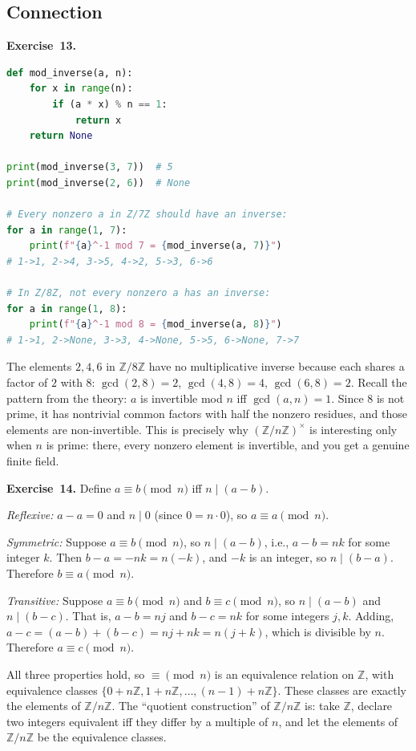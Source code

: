 \documentclass[11pt]{article}
\begin{document}
\subsection*{Connection}

\textbf{Exercise~13.}
\begin{lstlisting}[language=Python]
def mod_inverse(a, n):
    for x in range(n):
        if (a * x) % n == 1:
            return x
    return None

print(mod_inverse(3, 7))  # 5
print(mod_inverse(2, 6))  # None

# Every nonzero a in Z/7Z should have an inverse:
for a in range(1, 7):
    print(f"{a}^-1 mod 7 = {mod_inverse(a, 7)}")
# 1->1, 2->4, 3->5, 4->2, 5->3, 6->6

# In Z/8Z, not every nonzero a has an inverse:
for a in range(1, 8):
    print(f"{a}^-1 mod 8 = {mod_inverse(a, 8)}")
# 1->1, 2->None, 3->3, 4->None, 5->5, 6->None, 7->7
\end{lstlisting}

The elements $2, 4, 6$ in $\mathbb{Z}/8\mathbb{Z}$ have no multiplicative inverse because each shares a factor of $2$ with $8$: $\gcd(2, 8) = 2$, $\gcd(4, 8) = 4$, $\gcd(6, 8) = 2$. Recall the pattern from the theory: $a$ is invertible mod $n$ iff $\gcd(a, n) = 1$. Since $8$ is not prime, it has nontrivial common factors with half the nonzero residues, and those elements are non-invertible. This is precisely why $(\mathbb{Z}/n\mathbb{Z})^{\times}$ is interesting only when $n$ is prime: there, every nonzero element is invertible, and you get a genuine finite field.

\medskip
\textbf{Exercise~14.}
Define $a \equiv b \pmod n$ iff $n \mid (a - b)$.

\emph{Reflexive:} $a - a = 0$ and $n \mid 0$ (since $0 = n \cdot 0$), so $a \equiv a \pmod n$. \checkmark

\emph{Symmetric:} Suppose $a \equiv b \pmod n$, so $n \mid (a - b)$, i.e., $a - b = nk$ for some integer $k$. Then $b - a = -nk = n(-k)$, and $-k$ is an integer, so $n \mid (b - a)$. Therefore $b \equiv a \pmod n$. \checkmark

\emph{Transitive:} Suppose $a \equiv b \pmod n$ and $b \equiv c \pmod n$, so $n \mid (a - b)$ and $n \mid (b - c)$. That is, $a - b = nj$ and $b - c = nk$ for some integers $j, k$. Adding, $a - c = (a - b) + (b - c) = nj + nk = n(j + k)$, which is divisible by $n$. Therefore $a \equiv c \pmod n$. \checkmark

All three properties hold, so $\equiv \pmod n$ is an equivalence relation on $\mathbb{Z}$, with equivalence classes $\{0 + n\mathbb{Z}, 1 + n\mathbb{Z}, \ldots, (n-1) + n\mathbb{Z}\}$. These classes are exactly the elements of $\mathbb{Z}/n\mathbb{Z}$. The ``quotient construction'' of $\mathbb{Z}/n\mathbb{Z}$ is: take $\mathbb{Z}$, declare two integers equivalent iff they differ by a multiple of $n$, and let the elements of $\mathbb{Z}/n\mathbb{Z}$ be the equivalence classes.
\end{document}
